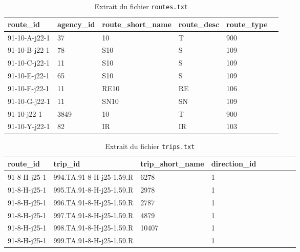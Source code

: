 \begin{itemize}
    \begin{table}[H]
    \caption{Extrait du fichier \texttt{routes.txt}}
    \label{tab:routes}
    \centering
    \begin{tabular}{l l l l l l}
    \toprule
    route\_id & agency\_id & route\_short\_name & route\_desc & route\_type \\
    \midrule
    91-10-A-j22-1 & 37 & 10 & T & 900 \\
    91-10-B-j22-1 & 78 & S10 & S & 109 \\
    91-10-C-j22-1 & 11 & S10 & S & 109 \\
    91-10-E-j22-1 & 65 & S10 & S & 109 \\
    91-10-F-j22-1 & 11 & RE10 & RE & 106 \\
    91-10-G-j22-1 & 11 & SN10 & SN & 109 \\
    91-10-j22-1 & 3849 & 10 & T & 900 \\
    91-10-Y-j22-1 & 82 & IR & IR & 103 \\
    \bottomrule
    \end{tabular}
    \end{table}

    \begin{table}[H]
    \caption{Extrait du fichier \texttt{trips.txt}}
    \label{tab:trips}
    \centering
    \begin{tabular}{l l l l l l l l l}
    \toprule
    route\_id & trip\_id & trip\_short\_name & direction\_id  \\
    \midrule
    91-8-H-j25-1  & 994.TA.91-8-H-j25-1.59.R  & 6278 & 1 \\
    91-8-H-j25-1  & 995.TA.91-8-H-j25-1.59.R  & 2978 & 1 \\
    91-8-H-j25-1  & 996.TA.91-8-H-j25-1.59.R & 2787 & 1 \\
    91-8-H-j25-1  & 997.TA.91-8-H-j25-1.59.R  & 4879 & 1 \\
    91-8-H-j25-1  & 998.TA.91-8-H-j25-1.59.R  & 10407 & 1 \\
    91-8-H-j25-1  & 999.TA.91-8-H-j25-1.59.R  & & 1 & \\
    \bottomrule
    \end{tabular}
    \end{table}


\end{itemize}
